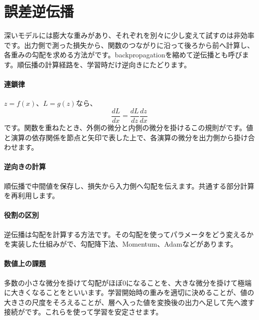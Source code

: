 \par
\endgroup
\par
\endgroup


\section{誤差逆伝播}
\label{sec:06-machine-learning-20}

深いモデルには膨大な重みがあり、それぞれを別々に少し変えて試すのは非効率です。出力側で測った損失から、関数のつながりに沿って後ろから前へ計算し、各重みの勾配を求める方法がです。backpropagationを縮めて逆伝播とも呼びます。順伝播の計算経路を、学習時だけ逆向きにたどります。

\begingroup
\begingroup
\paragraph{連鎖律}
        $z=f(x)$、$L=g(z)$なら、
        \[
          \frac{dL}{dx}
          =\frac{dL}{dz}\frac{dz}{dx}
        \]
        です。関数を重ねたとき、外側の微分と内側の微分を掛けるこの規則がです。値と演算の依存関係を節点と矢印で表した上で、各演算の微分を出力側から掛け合わせます。

\paragraph{逆向きの計算}
        順伝播で中間値を保存し、損失から入力側へ勾配を伝えます。共通する部分計算を再利用します。

\par
\endgroup
\medskip
\begingroup
\paragraph{役割の区別}
        逆伝播は勾配を計算する方法です。その勾配を使ってパラメータをどう変えるかを実装した仕組みがで、勾配降下法、Momentum、Adamなどがあります。

\paragraph{数値上の課題}
        多数の小さな微分を掛けて勾配がほぼ0になることを、大きな微分を掛けて極端に大きくなることをといいます。学習開始時の重みを適切に決めることが、値の大きさの尺度をそろえることが、層へ入った値を変換後の出力へ足して先へ渡す接続がです。これらを使って学習を安定させます。

